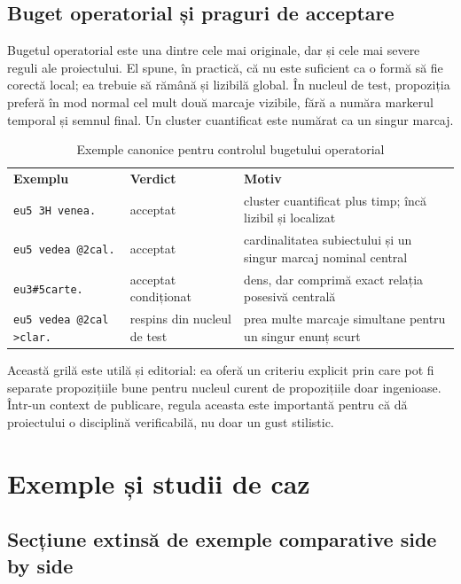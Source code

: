 \documentclass[12pt,onecolumn,letterpaper]{article}
\newcommand{\rs}[1]{\texttt{#1}}
\newcommand{\RStablelayout}{%
\footnotesize
\setlength{\tabcolsep}{6pt}%
\renewcommand{\arraystretch}{1.12}%
\arrayrulecolor{RSRule}%
}
\begin{document}
\subsection{Buget operatorial și praguri de acceptare}

Bugetul operatorial este una dintre cele mai originale, dar și cele mai severe
reguli ale proiectului. El spune, în practică, că nu este suficient ca o formă
să fie corectă local; ea trebuie să rămână și lizibilă global. În nucleul de
test, propoziția preferă în mod normal cel mult două marcaje vizibile, fără a
număra markerul temporal și semnul final. Un cluster cuantificat este numărat ca
un singur marcaj.

\begin{table}[h!]
\centering
\RStablelayout
\begin{tabularx}{\linewidth}{@{}YlY@{}}
\textbf{Exemplu} & \textbf{Verdict} & \textbf{Motiv} \\
\rs{eu5 3H venea.} & acceptat & cluster cuantificat plus timp; încă lizibil și localizat \\
\rs{eu5 vedea @2cal.} & acceptat & cardinalitatea subiectului și un singur marcaj nominal central \\
\rs{eu3\#5carte.} & acceptat condiționat & dens, dar comprimă exact relația posesivă centrală \\
\rs{eu5 vedea @2cal >clar.} & respins din nucleul de test & prea multe marcaje simultane pentru un singur enunț scurt \\
\bottomrule
\end{tabularx}
\caption{Exemple canonice pentru controlul bugetului operatorial}
\end{table}

Această grilă este utilă și editorial: ea oferă un criteriu explicit prin care
pot fi separate propozițiile bune pentru nucleul curent de propozițiile doar
ingenioase. Într-un context de publicare, regula aceasta este importantă pentru
că dă proiectului o disciplină verificabilă, nu doar un gust stilistic.

\section{Exemple și studii de caz}

\subsection{Secțiune extinsă de exemple comparative side by side}
\end{document}
